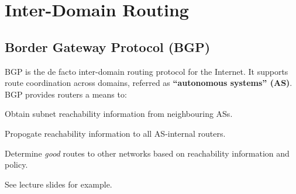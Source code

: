 \documentclass[11pt]{article}
\begin{document}
\section{Inter-Domain Routing}
\label{sec:org735079c}
\subsection{Border Gateway Protocol (BGP)}
\label{sec:org4186e5c}
BGP is the de facto inter-domain routing protocol for the Internet.
It supports route coordination across domains, referred as \textbf{``autonomous systems'' (AS)}.
BGP provides routers a means to:
\begin{description}
\item[{e(xternal)BGP}] Obtain subnet reachability information from neighbouring ASs.
\item[{i(nternal)BGP}] Propogate reachability information to all AS-internal routers.
\item Determine \emph{good} routes to other networks based on reachability information and policy.
\end{description}
See lecture slides for example.
\end{document}
